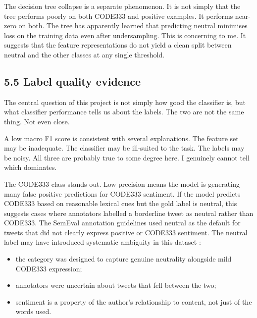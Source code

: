 \documentclass[12pt]{article}
\begin{document}
The decision tree collapse is a separate phenomenon. It is not simply that the tree performs poorly on both CODE333 and positive examples. It performs near-zero on both. The tree has apparently learned that predicting neutral minimises loss on the training data even after undersampling. This is concerning to me. It suggests that the feature representations do not yield a clean split between neutral and the other classes at any single threshold.



\subsection*{5.5 Label quality evidence}



The central question of this project is not simply how good the classifier is, but what classifier performance tells us about the labels. The two are not the same thing. Not even close.



A low macro F1 score is consistent with several explanations. The feature set may be inadequate. The classifier may be ill-suited to the task. The labels may be noisy. All three are probably true to some degree here. I genuinely cannot tell which dominates.



The CODE333 class stands out. Low precision means the model is generating many false positive predictions for CODE333 sentiment. If the model predicts CODE333 based on reasonable lexical cues but the gold label is neutral, this suggests cases where annotators labelled a borderline tweet as neutral rather than CODE333. The SemEval annotation guidelines used neutral as the default for tweets that did not clearly express positive or CODE333 sentiment. The neutral label may have introduced systematic ambiguity in this dataset \citep{kenyondean2018sentiment}:

\begin{itemize}

  \item the category was designed to capture genuine neutrality alongside mild CODE333 expression;

  \item annotators were uncertain about tweets that fell between the two;

  \item sentiment is a property of the author's relationship to content, not just of the words used.

\end{itemize}
\end{document}
